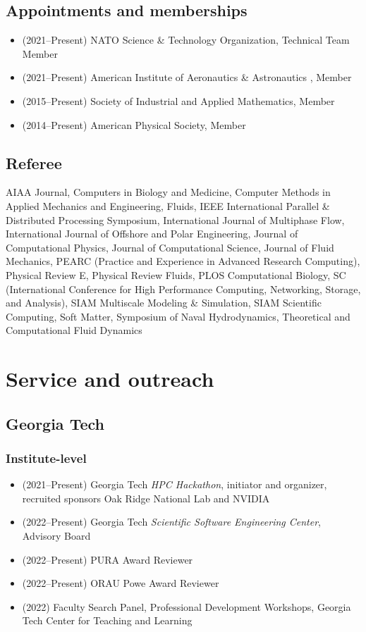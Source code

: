 \subsection{Appointments and memberships}

\begin{itemize}
    \item (2021--Present) NATO Science \& Technology Organization, Technical Team Member
    \item (2021--Present) American Institute of Aeronautics \& Astronautics , Member
    \item (2015--Present) Society of Industrial and Applied Mathematics, Member
    \item (2014--Present) American Physical Society, Member
\end{itemize}

\subsection{Referee}

AIAA Journal,
Computers in Biology and Medicine,
Computer Methods in Applied Mechanics and Engineering,
Fluids,
IEEE International Parallel \& Distributed Processing Symposium,
International Journal of Multiphase Flow,
International Journal of Offshore and Polar Engineering,
Journal of Computational Physics,
Journal of Computational Science,
Journal of Fluid Mechanics,
PEARC (Practice and Experience in Advanced Research Computing),
Physical Review E,
Physical Review Fluids,
PLOS Computational Biology,
SC (International Conference for High Performance Computing, Networking, Storage, and Analysis),
SIAM Multiscale Modeling \& Simulation,
SIAM Scientific Computing,
Soft Matter,
Symposium of Naval Hydrodynamics,
Theoretical and Computational Fluid Dynamics

\section{Service and outreach}

\subsection{Georgia Tech}

\subsubsection{Institute-level}

\begin{itemize}
    \item (2021--Present) Georgia Tech \textit{HPC Hackathon}, initiator and organizer, recruited sponsors Oak Ridge National Lab and NVIDIA 
    \item (2022--Present) Georgia Tech \textit{Scientific Software Engineering Center}, Advisory Board
    \item (2022--Present) PURA Award Reviewer
    \item (2022--Present) ORAU Powe Award Reviewer
    \item (2022) Faculty Search Panel, Professional Development Workshops, Georgia Tech Center for Teaching and Learning
\end{itemize}

